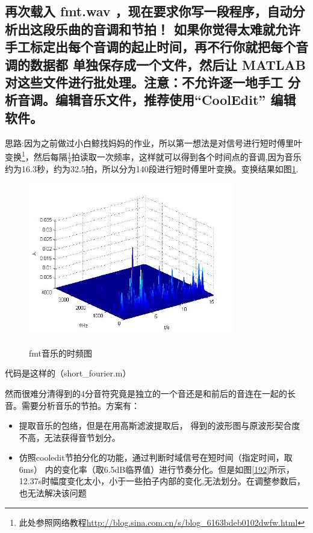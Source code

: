 \documentclass{ctexart}
\begin{document}
    \subsection{
            再次载入 fmt.wav ，现在要求你写一段程序，自动分析出这段乐曲的音调和节拍！
            如果你觉得太难就允许手工标定出每个音调的起止时间，再不行你就把每个音调的数据都
            单独保存成一个文件，然后让 MATLAB 对这些文件进行批处理。注意：不允许逐一地手工
            分析音调。编辑音乐文件，推荐使用“CoolEdit” 编辑软件。
        }

        思路:因为之前做过小白鲸找妈妈的作业，所以第一想法是对信号进行短时傅里叶变换\footnote{此处参照网络教程\url{http://blog.sina.com.cn/s/blog_6163bdeb0102dwfw.html}}，然后每隔$\frac{1}{4}$拍读取一次频率，这样就可以得到各个时间点的音调,因为音乐约为16.3秒，约为32.5拍，所以分为140段进行短时傅里叶变换。变换结果如图\ref{191}.
        \begin{figure}
            \centering
            \includegraphics[width=0.8\textwidth]{fmt/1_9_1.jpg}\\
            \caption{fmt音乐的时频图\label{191}}
        \end{figure}


        代码是这样的（short\_fourier.m）
        

        然而很难分清得到的4分音符究竟是独立的一个音还是和前后的音连在一起的长音。需要分析音乐的节拍。方案有：
        \begin{itemize}
            \item{提取音乐的包络，但是在用高斯滤波提取后，
                得到的波形图与原波形契合度不高，无法获得音节划分。}
            \item{仿照cooledit节拍分化的功能，通过判断时域信号在短时间（指定时间，取6ms）
                    内的变化率（取6.5dB临界值）进行节奏分化。但是如图\ref{192}所示，
                    12.37s时幅度变化太小，小于一些拍子内部的变化,无法划分。在调整参数后，
                也无法解决该问题}
        \end{itemize}
\end{document}

